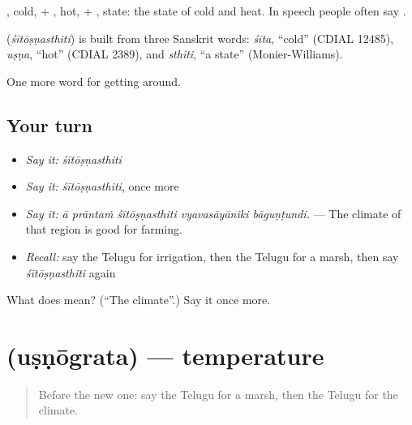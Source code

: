 , cold, + , hot, + , state: the state of cold and heat. In speech people often say .

\begin{cousinweb}
\textbf{} (\emph{śītōṣṇasthiti}) is built from three Sanskrit words: \emph{śīta}, \textquotedblleft{}cold\textquotedblright{} (CDIAL 12485), \emph{uṣṇa}, \textquotedblleft{}hot\textquotedblright{} (CDIAL 2389), and \emph{sthiti}, \textquotedblleft{}a state\textquotedblright{} (Monier-Williams).
\end{cousinweb}

\begin{grammarlens}[title={What you've built}]
One more word for getting around.
\end{grammarlens}

\subsection*{Your turn}
\begin{itemize}
\raggedright
  \item \emph{Say it:} \emph{śītōṣṇasthiti}
  \item \emph{Say it:} \emph{śītōṣṇasthiti}, once more
  \item \emph{Say it:} \emph{ā prāntaṁ śītōṣṇasthiti vyavasāyāniki bāguṇṭundi.} — The climate of that region is good for farming.
  \item \emph{Recall:} say the Telugu for irrigation, then the Telugu for a marsh, then say \emph{śītōṣṇasthiti} again
\end{itemize}

\begin{tcolorbox}[breakable,colback=teal!4,colframe=teal!35!black,title={Before you move on}]
What does  mean? (\textquotedblleft{}The climate\textquotedblright{}.) Say it once more.
\end{tcolorbox}
\section[\texorpdfstring{\te{ఉష్ణోగ్రత} (uṣṇōgrata)}{ఉష్ణోగ్రత (uṣṇōgrata)}]{ (uṣṇōgrata) — temperature}

\label{lesson:TE-C476-usnograta}



\begin{quote}
Before the new one: say the Telugu for a marsh, then the Telugu for the climate.
\end{quote}

